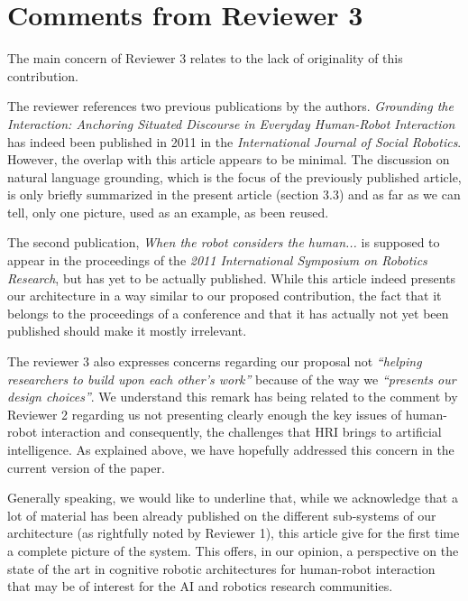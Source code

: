 \documentclass{article}
\begin{document}
\section{Comments from Reviewer 3}

The main concern of Reviewer 3 relates to the lack of originality of this
contribution.

The reviewer references two previous publications by the authors. \emph{Grounding
the Interaction: Anchoring Situated Discourse in Everyday Human-Robot
Interaction} has indeed been published in 2011 in the \emph{International Journal of
Social Robotics}. However, the overlap with this article appears to be minimal. The
discussion on natural language grounding, which is the focus of the previously
published article, is only briefly summarized in the present article (section
3.3) and as far as we can tell, only one picture, used as an example, as been
reused.

The second publication, \emph{When the robot considers the human...} is supposed
to appear in the proceedings of the \emph{2011 International Symposium on
Robotics Research}, but has yet to be actually published.  While this article
indeed presents our architecture in a way similar to our proposed contribution,
the fact that it belongs to the proceedings of a conference and that it has
actually not yet been published should make it mostly irrelevant.

The reviewer 3 also expresses concerns regarding our proposal not \emph{``helping
researchers to build upon each other's work''} because of the way we
\emph{``presents our design choices''}. We understand this remark has being
related to the comment by Reviewer 2 regarding us not presenting clearly
enough the key issues of human-robot interaction and consequently, the
challenges that HRI brings to artificial intelligence. As explained above, we
have hopefully addressed this concern in the current version of the paper.

Generally speaking, we would like to underline that, while we acknowledge that a
lot of material has been already published on the different sub-systems of
our architecture (as rightfully noted by Reviewer 1), this article give for the
first time a complete picture of the system. This offers, in our opinion, a
perspective on the state of the art in cognitive robotic architectures
for human-robot interaction that may be of interest for the AI and robotics
research communities.



\end{document}
